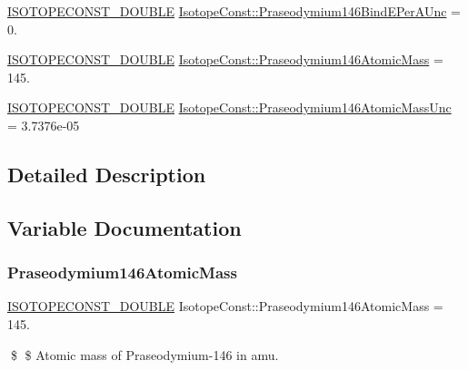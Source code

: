 \begin{DoxyCompactItemize}
\item 
\mbox{\hyperlink{group___isotope_const-_macros_ga8f45a7272ce02c0b4c65c44636ed719a}{I\+S\+O\+T\+O\+P\+E\+C\+O\+N\+S\+T\+\_\+\+D\+O\+U\+B\+LE}} \mbox{\hyperlink{group___isotope_const-_praseodymium-_pr146_ga0e9c690a571daed0586dbdc6fd8bae20}{Isotope\+Const\+::\+Praseodymium146\+Bind\+E\+Per\+A\+Unc}} = 0.
\item 
\mbox{\hyperlink{group___isotope_const-_macros_ga8f45a7272ce02c0b4c65c44636ed719a}{I\+S\+O\+T\+O\+P\+E\+C\+O\+N\+S\+T\+\_\+\+D\+O\+U\+B\+LE}} \mbox{\hyperlink{group___isotope_const-_praseodymium-_pr146_ga137763b59de728f4f6cd1fc3cde1b752}{Isotope\+Const\+::\+Praseodymium146\+Atomic\+Mass}} = 145.
\item 
\mbox{\hyperlink{group___isotope_const-_macros_ga8f45a7272ce02c0b4c65c44636ed719a}{I\+S\+O\+T\+O\+P\+E\+C\+O\+N\+S\+T\+\_\+\+D\+O\+U\+B\+LE}} \mbox{\hyperlink{group___isotope_const-_praseodymium-_pr146_gaf529bb44028472e953134eb8a9a1aaa8}{Isotope\+Const\+::\+Praseodymium146\+Atomic\+Mass\+Unc}} = 3.\+7376e-\/05
\end{DoxyCompactItemize}


\subsection{Detailed Description}


\subsection{Variable Documentation}
\mbox{\label{group___isotope_const-_praseodymium-_pr146_ga137763b59de728f4f6cd1fc3cde1b752}} 
\subsubsection{\texorpdfstring{Praseodymium146\+Atomic\+Mass}{Praseodymium146AtomicMass}}
{\footnotesize\ttfamily \mbox{\hyperlink{group___isotope_const-_macros_ga8f45a7272ce02c0b4c65c44636ed719a}{I\+S\+O\+T\+O\+P\+E\+C\+O\+N\+S\+T\+\_\+\+D\+O\+U\+B\+LE}} Isotope\+Const\+::\+Praseodymium146\+Atomic\+Mass = 145.}

\$ \$ Atomic mass of Praseodymium-\/146 in amu. \mbox{\label{group___isotope_const-_praseodymium-_pr146_gaf529bb44028472e953134eb8a9a1aaa8}} 
